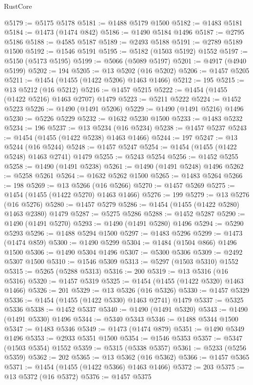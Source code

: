\begin{lexlean}{RustCore}
\begin{coremodule}
@5179 := @5175 @5178
@5181 := @1488 @5179 @1500
@5182 := @1483 @5181
@5184 := @1473 (@1474 @842)
@5186 := @1490 @5184 @1496
@5187 := @2795 @5186
@5188 := @4585 @5187
@5189 := @2493 @5188
@5191 := @2789 @5189 @1500
@5192 := @1546 @5191
@5195 := @5182 (@1503 @5192) @1552
@5197 := @5150 (@5173 @5195)
@5199 := @5066 (@5089 @5197)
@5201 := @4917 (@4940 @5199)
@5202 := 194
@5205 := @13 @5202 (@16 @5202)
@5206 := @1457 @5205
@5211 := @1454 (@1455 (@1422 @5206) @1463 @1466)
@5212 := 195
@5215 := @13 @5212 (@16 @5212)
@5216 := @1457 @5215
@5222 := @1454 (@1455 (@1422 @5216) @1463 @2707) @1479
@5223 := @5211 @5222
@5224 := @1452 @5223
@5226 := @1490 (@1491 @5206)
@5229 := @1490 (@1491 @5216) @1496
@5230 := @5226 @5229
@5232 := @1632 @5230 @1500
@5233 := @1483 @5232
@5234 := 196
@5237 := @13 @5234 (@16 @5234)
@5238 := @1457 @5237
@5243 := @1454 (@1455 (@1422 @5238) @1463 @1466)
@5244 := 197
@5247 := @13 @5244 (@16 @5244)
@5248 := @1457 @5247
@5254 := @1454 (@1455 (@1422 @5248) @1463 @2741) @1479
@5255 := @5243 @5254
@5256 := @1452 @5255
@5258 := @1490 (@1491 @5238)
@5261 := @1490 (@1491 @5248) @1496
@5262 := @5258 @5261
@5264 := @1632 @5262 @1500
@5265 := @1483 @5264
@5266 := 198
@5269 := @13 @5266 (@16 @5266)
@5270 := @1457 @5269
@5275 := @1454 (@1455 (@1422 @5270) @1463 @1466)
@5276 := 199
@5279 := @13 @5276 (@16 @5276)
@5280 := @1457 @5279
@5286 := @1454 (@1455 (@1422 @5280) @1463 @2380) @1479
@5287 := @5275 @5286
@5288 := @1452 @5287
@5290 := @1490 (@1491 @5270)
@5293 := @1490 (@1491 @5280) @1496
@5294 := @5290 @5293
@5296 := @1488 @5294 @1500
@5297 := @1483 @5296
@5299 := @1473 (@1474 @859)
@5300 := @1490 @5299
@5304 := @1484 (@1504 @866) @1496 @1500
@5306 := @1490 @5304 @1496
@5307 := @5300 @5306
@5309 := @2492 @5307 @1500
@5310 := @1546 @5309
@5313 := @5297 (@1503 @5310) @1552
@5315 := @5265 (@5288 @5313)
@5316 := 200
@5319 := @13 @5316 (@16 @5316)
@5320 := @1457 @5319
@5325 := @1454 (@1455 (@1422 @5320) @1463 @1466)
@5326 := 201
@5329 := @13 @5326 (@16 @5326)
@5330 := @1457 @5329
@5336 := @1454 (@1455 (@1422 @5330) @1463 @2741) @1479
@5337 := @5325 @5336
@5338 := @1452 @5337
@5340 := @1490 (@1491 @5320)
@5343 := @1490 (@1491 @5330) @1496
@5344 := @5340 @5343
@5346 := @1488 @5344 @1500
@5347 := @1483 @5346
@5349 := @1473 (@1474 @879)
@5351 := @1490 @5349 @1496
@5353 := @2933 @5351 @1500
@5354 := @1546 @5353
@5357 := @5347 (@1503 @5354) @1552
@5359 := @5315 (@5338 @5357)
@5361 := @5233 (@5256 @5359)
@5362 := 202
@5365 := @13 @5362 (@16 @5362)
@5366 := @1457 @5365
@5371 := @1454 (@1455 (@1422 @5366) @1463 @1466)
@5372 := 203
@5375 := @13 @5372 (@16 @5372)
@5376 := @1457 @5375

\end{coremodule}
\end{lexlean}
